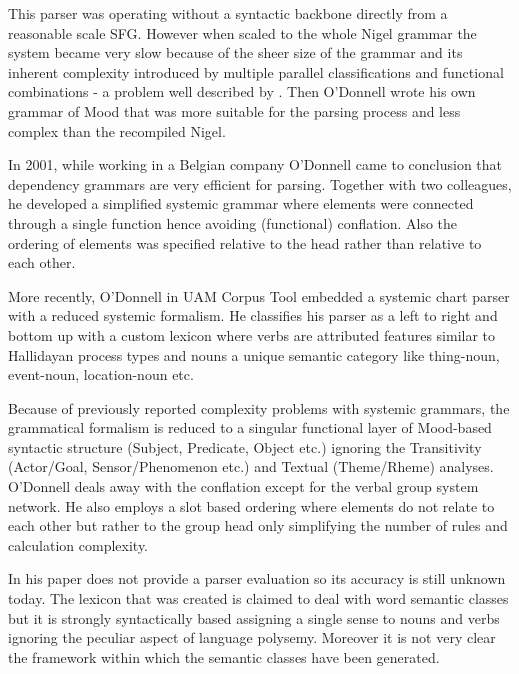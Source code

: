 This parser was operating without a syntactic backbone directly from a reasonable scale SFG. However when scaled to the whole Nigel grammar the system became very slow because of the sheer size of the grammar and its inherent complexity introduced by multiple parallel classifications and functional combinations - a problem well described by \citet{Bateman2008}. Then O'Donnell wrote his own grammar of Mood that was more suitable for the parsing process and less complex than the recompiled Nigel.

In 2001, while working in a Belgian company O'Donnell came to conclusion that dependency grammars are very efficient for parsing. Together with two colleagues, he developed a simplified systemic grammar where elements were connected through a single function hence avoiding (functional) conflation. Also the ordering of elements was specified relative to the head rather than relative to each other.

More recently, O'Donnell in UAM Corpus Tool embedded a systemic chart parser \citep{ODonnell2005a} with a reduced systemic formalism. He classifies his parser as a left to right and bottom up with a custom lexicon where verbs are attributed features similar to Hallidayan process types and nouns a unique semantic category like thing-noun, event-noun, location-noun etc.

Because of previously reported complexity problems \citep{ODonnell1993} with systemic grammars, the grammatical formalism is reduced to a singular functional layer of Mood-based syntactic structure (Subject, Predicate, Object etc.) ignoring the Transitivity (Actor/Goal, Sensor/Phenomenon etc.) and  Textual (Theme/Rheme) analyses. %
O'Donnell deals away with the conflation except for the verbal group system network. He also employs a slot based ordering where elements do not relate to each other but rather to the group head only simplifying the number of rules and calculation complexity.   

In his paper \citep{ODonnell2005a} does not provide a parser evaluation so its accuracy is still unknown today. The lexicon that was created is claimed to deal with word semantic classes but it is strongly syntactically based assigning a single sense to nouns and verbs ignoring the peculiar aspect of language polysemy. Moreover it is not very clear the framework within which the semantic classes have been generated. 

